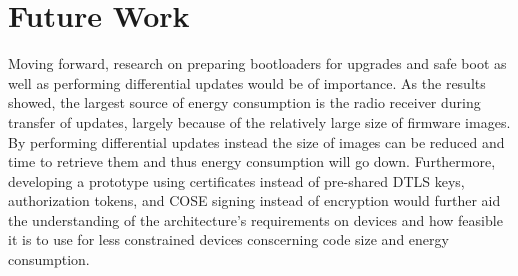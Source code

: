 \documentclass[0-thesis.tex]{subfiles}
\begin{document}
\section{Future Work}
\label{sec:future-work}
Moving forward, research on preparing bootloaders for upgrades and safe boot as well as
performing differential updates would be of importance. As the results showed, the largest
source of energy consumption is the radio receiver during transfer of updates, largely
because of the relatively large size of firmware images. By performing differential
updates instead the size of images can be reduced and time to retrieve them and thus
energy consumption will go down. Furthermore, developing a prototype using certificates
instead of pre-shared DTLS keys, authorization tokens, and COSE signing instead of
encryption would further aid the understanding of the architecture's requirements on
devices and how feasible it is to use for less constrained devices conscerning code size
and energy consumption. 
\end{document}
